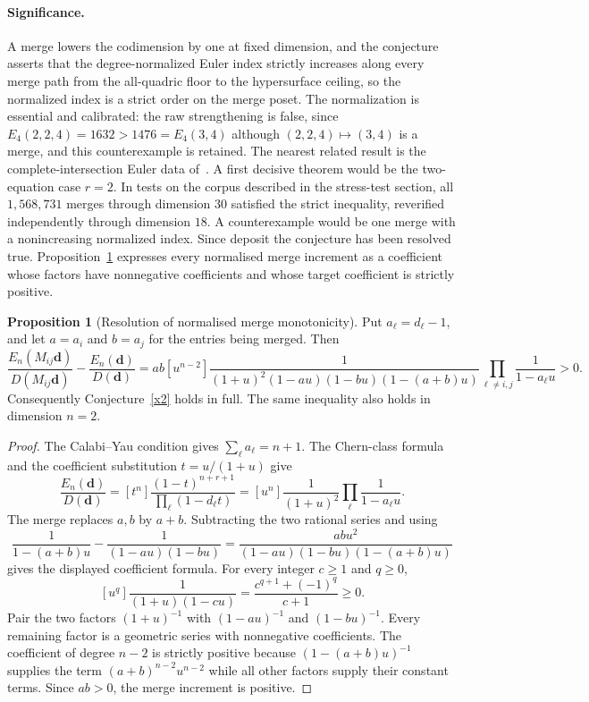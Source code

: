 \documentclass[11pt]{article}
\theoremstyle{definition}
\newtheorem{proposition}{Proposition}
\begin{document}
\paragraph{Significance.}
A merge lowers the codimension by one at fixed dimension, and the conjecture asserts that the degree-normalized Euler index strictly increases along every merge path from the all-quadric floor to the hypersurface ceiling, so the normalized index is a strict order on the merge poset.  The normalization is essential and calibrated: the raw strengthening is false, since $E_4(2,2,4)=1632>1476=E_4(3,4)$ although $(2,2,4)\mapsto(3,4)$ is a merge, and this counterexample is retained.  The nearest related result is the complete-intersection Euler data of~\cite{He21}.  A first decisive theorem would be the two-equation case $r=2$.  In tests on the corpus described in the stress-test section, all $1{,}568{,}731$ merges through dimension $30$ satisfied the strict inequality, reverified independently through dimension $18$.  A counterexample would be one merge with a nonincreasing normalized index.  Since deposit the conjecture has been resolved true.  Proposition~\ref{x:merge} expresses every normalised merge increment as a coefficient whose factors have nonnegative coefficients and whose target coefficient is strictly positive.

\begin{proposition}[Resolution of normalised merge monotonicity]\label{x:merge}
Put $a_\ell=d_\ell-1$, and let $a=a_i$ and $b=a_j$ for the entries being merged.  Then
\[
\frac{E_n(M_{ij}\mathbf d)}{D(M_{ij}\mathbf d)}-
\frac{E_n(\mathbf d)}{D(\mathbf d)}
=ab[u^{n-2}]\frac{1}{(1+u)^2(1-au)(1-bu)(1-(a+b)u)}
\prod_{\ell\ne i,j}\frac{1}{1-a_\ell u}>0.
\]
Consequently Conjecture~\ref{x2} holds in full.  The same inequality also holds in dimension $n=2$.
\end{proposition}

\begin{proof}
The Calabi--Yau condition gives $\sum_\ell a_\ell=n+1$.  The Chern-class formula and the coefficient substitution $t=u/(1+u)$ give
\[
\frac{E_n(\mathbf d)}{D(\mathbf d)}
=[t^n]\frac{(1-t)^{n+r+1}}{\prod_\ell(1-d_\ell t)}
=[u^n]\frac{1}{(1+u)^2}\prod_\ell\frac{1}{1-a_\ell u}.
\]
The merge replaces $a,b$ by $a+b$.  Subtracting the two rational series and using
\[
\frac{1}{1-(a+b)u}-\frac{1}{(1-au)(1-bu)}
=\frac{ab u^2}{(1-au)(1-bu)(1-(a+b)u)}
\]
gives the displayed coefficient formula.  For every integer $c\ge1$ and $q\ge0$,
\[
[u^q]\frac{1}{(1+u)(1-cu)}=\frac{c^{q+1}+(-1)^q}{c+1}\ge0.
\]
Pair the two factors $(1+u)^{-1}$ with $(1-au)^{-1}$ and $(1-bu)^{-1}$.  Every remaining factor is a geometric series with nonnegative coefficients.  The coefficient of degree $n-2$ is strictly positive because $(1-(a+b)u)^{-1}$ supplies the term $(a+b)^{n-2}u^{n-2}$ while all other factors supply their constant terms.  Since $ab>0$, the merge increment is positive.
\end{proof}
\end{document}
